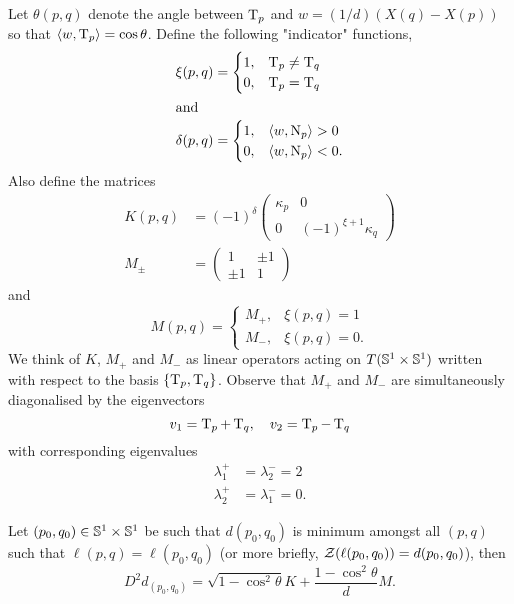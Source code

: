 \documentclass[a4paper, 12pt]{amsart}
\begin{document}
Let $\theta(p,q)$ denote the angle between $\tang_{p}$ and $w = (1/d)(X(q) - X(p))$ so that $\inpr{w}{\tang_p} = \cos\theta$. Define the following "indicator" functions,
\begin{align*}
\xi(p, q) &= \begin{cases}
1,& \tang_{p} \ne \tang_{q} \\
0,& \tang_{p} = \tang_{q}
\end{cases} \\
\intertext{and}
\delta(p, q) &= \begin{cases}
1,& \inpr{w}{\nor_{p}} > 0 \\
0,& \inpr{w}{\nor_{p}} < 0.
\end{cases}
\end{align*}
Also define the matrices
\begin{align*}
K(p,q) &= (-1)^{\delta}\begin{pmatrix}
\kappa_{p} & 0 \\
0 & (-1)^{\xi +1} \kappa_{q}
\end{pmatrix} \\
M_{\pm} &= \begin{pmatrix}
1 & \pm 1 \\
\pm 1 & 1 
\end{pmatrix}
\end{align*}
and
\[
M(p,q) = \begin{cases}
M_+,& \xi(p,q) = 1 \\
M_-,& \xi(p,q) = 0.
\end{cases}
\]
We think of $K$, $M_+$ and $M_-$ as linear operators acting on $T(\S^1\times\S^1)$ written with respect to the basis $\{\tang_p, \tang_q\}$. Observe that $M_+$ and $M_-$ are simultaneously diagonalised by the eigenvectors 
\begin{equation}
\label{eq:eigenvectors}
v_1 = \tang_{p} + \tang_{q}, \quad v_2 = \tang_{p} - \tang_{q}
\end{equation}
with corresponding eigenvalues
\begin{equation}
\label{eq:eigenvalues}
\begin{split}
\lambda^+_1 &= \lambda^-_2 = 2 \\
\lambda^+_2 &= \lambda^-_1 = 0.
\end{split}
\end{equation} 

\begin{prop}
\label{prop:spatial_var}
Let $(p_0, q_0) \in \S^1 \times \S^1$ be such that $d(p_0, q_0)$ is minimum amongst all $(p,q)$ such that $\ell(p, q) = \ell(p_0, q_0)$ (or more briefly, $\chordarcprofile(\ell(p_0,q_0)) = d(p_0, q_0)$), then 
\[
D^2d_{(p_0,q_0)} =  \sqrt{1-\cos^2\theta}K + \frac{1-\cos^2 \theta}{d} M.
\]
\end{prop}
\end{document}
